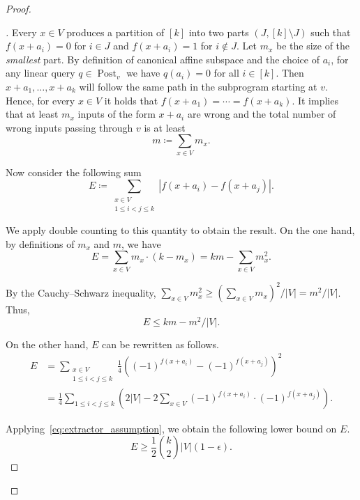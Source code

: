 \documentclass[10pt,a4paper]{article}
\theoremstyle{definition}
\theoremstyle{remark}
\newenvironment{claimproof}[1][\proofname]{\begin{proof}[#1]\renewcommand*{\qedsymbol}{$\blacksquare$}}{\end{proof}}
\DeclareMathOperator{\post}{Post}
\newcommand{\card}[1]{{\left|#1\right|}}
\begin{document}
\begin{proof}
\begin{claimproof}
    Every $x \in V$ produces a partition of $[k]$ into two parts $(J, [k] \setminus J)$ such that $f(x+a_i) = 0$ for $i \in J$ and $f(x+a_i) = 1$ for $i \not\in J$. Let $m_x$ be the size of the \emph{smallest} part.
    By definition of canonical affine subspace and the choice of $a_i$, for any linear query $q \in \post_v$ we have $q(a_i) = 0$ for all $i \in [k]$. Then $x+a_1, \ldots, x+a_k$ will follow the same path in the subprogram starting at $v$. Hence, for every $x \in V$ it holds that $f(x+a_1) = \cdots = f(x+a_k)$. It implies that at least $m_x$ inputs of the form $x+a_i$ are wrong and the total number of wrong inputs passing through $v$ is at least
    \[
      m \coloneqq \sum_{x \in V} m_x.
    \]
  
    Now consider the following sum
    \[
%
      E \coloneqq
      \sum_{\substack{x \in V \\ 1\le i<j \le k}} |f(x+a_i) - f(x+a_j)|.
    \]

    We apply double counting to this quantity to obtain the result.
    On the one hand, by definitions of $m_x$ and $m$, we have
    \begin{equation*}
      E = \sum_{x \in V} m_x \cdot (k - m_x) = k m - \sum_{x \in V} m_x^2.
    \end{equation*}
  
    By the Cauchy--Schwarz inequality, $\sum_{x \in V} m_x^2 \ge {\left(\sum_{x \in V} m_x\right)}^2 / \card{V} = m^2/\card{V}$. Thus,
    \begin{equation}\label{eq:bad_inputs_upper_bound}
      E \le km-m^2/\card{V}.
    \end{equation}
  
    On the other hand, $E$ can be rewritten as follows.
    \begin{equation*}
      \begin{aligned}
%
        E &=
        \sum_{\substack{x \in V \\ 1\le i<j \le k}} \frac{1}{4} {\left({(-1)}^{f(x+a_i)} - {(-1)}^{f(x+a_j)}\right)}^2 \\ &=
        \frac{1}{4} \sum_{1 \le i < j \le k} \left( 2\card{V} - 2\sum_{x\in V} {(-1)}^{f(x+a_i)} \cdot {(-1)}^{f(x+a_j)}\right).
      \end{aligned}
    \end{equation*}

    Applying~\eqref{eq:extractor_assumption}, we obtain the following lower bound on $E$.
    \begin{equation}\label{eq:bad_inputs_lower_bound}
      E \ge \frac{1}{2} \binom{k}{2} \card{V} (1-\epsilon).
    \end{equation}
  

\end{claimproof}
\end{proof}
\end{document}
